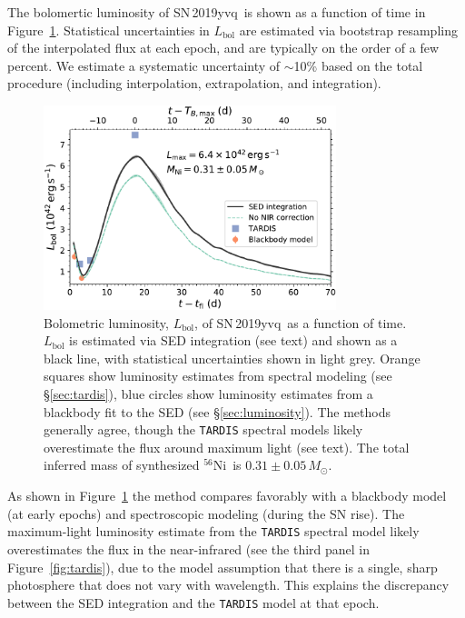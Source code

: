 \documentclass[twocolumn]{aastex63}
\newcommand{\radni}{$^{56}$Ni}
\newcommand{\sn}{SN\,2019yvq}
\begin{document}
The bolomertic luminosity of \sn\ is shown as a function of time in
Figure~\ref{fig:Lbol}. Statistical uncertainties in $L_\mathrm{bol}$ are
estimated via bootstrap resampling of the interpolated flux at each epoch, and
are typically on the order of a few percent. We estimate a systematic
uncertainty of $\sim$10\% based on the total procedure (including
interpolation, extrapolation, and integration). 

\begin{figure}
    \centering
    \includegraphics[width=3.35in]{./figures/L_bolometric.pdf}
    \caption{Bolometric luminosity, $L_\mathrm{bol}$, of \sn\ as a function of
    time. $L_\mathrm{bol}$ is estimated via SED integration (see text) and
    shown as a black line, with statistical uncertainties shown in light grey.
    Orange squares show luminosity estimates from spectral modeling (see
    \S\ref{sec:tardis}), blue circles show luminosity estimates from a
    blackbody fit to the SED (see \S\ref{sec:luminosity}). The methods
    generally agree, though the \texttt{TARDIS} spectral models likely
    overestimate the flux around maximum light (see text). The total inferred
    mass of synthesized \radni\ is $0.31 \pm 0.05\,M_\odot$.}
    \label{fig:Lbol}
\end{figure}

As shown in Figure~\ref{fig:Lbol} the method compares favorably with a
blackbody model (at early epochs) and spectroscopic modeling (during the SN
rise). The maximum-light luminosity estimate from the \texttt{TARDIS} spectral
model likely overestimates the flux in the near-infrared (see the third panel
in Figure~\ref{fig:tardis}), due to the model assumption that there is a
single, sharp photosphere that does not vary with wavelength. This explains
the discrepancy between the SED integration and the \texttt{TARDIS} model at
that epoch.
\end{document}
